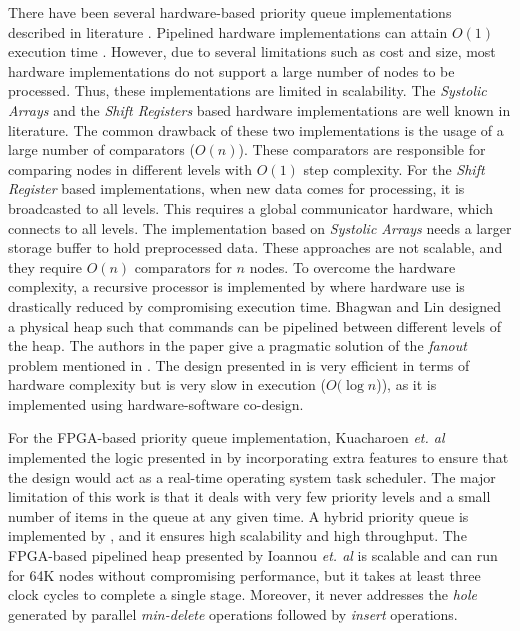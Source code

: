\documentclass[10pt, conference, compsocconf]{IEEEtran}
\begin{document}
There have been several hardware-based priority queue implementations described in literature \cite{hw1,hw2,hw3,hw5,hw6,hw7,hw8,hw9}.
Pipelined hardware implementations can attain $O(1)$ execution time \cite{hw5,hw6}.
However, due to several limitations such as cost and size, most hardware implementations do not support a large number of nodes to be processed.
Thus, these implementations are limited in scalability.
The {\it Systolic Arrays} and the {\it Shift Registers} \cite{hw8,hw9} based hardware implementations are well known in literature.
The common drawback of these two implementations is the usage of a large number of comparators ($O(n)$).
These comparators are responsible for comparing nodes in different levels with $O(1)$ step complexity.
For the {\it Shift Register} \cite{hw9} based implementations, when new data comes for processing, it is broadcasted to all levels.
This requires a global communicator hardware, which connects to all levels.
The implementation based on {\it Systolic Arrays} \cite{hw8} needs a larger storage buffer to hold preprocessed data.
These approaches are not scalable, and they require $O(n)$ comparators for $n$ nodes.
To overcome the hardware complexity, a recursive processor is implemented by \cite{hw10} where hardware use is drastically reduced by compromising execution time.
Bhagwan and Lin \cite{hw2} designed a physical heap such that commands can be pipelined between different levels of the heap.
The authors in the paper \cite{hw1} give a pragmatic solution of the {\it fanout} problem mentioned in \cite{hw3}.
The design presented in \cite{hw11} is very efficient in terms of hardware complexity but is very slow in execution ($O(\log n$)), as it is implemented using hardware-software co-design.

For the FPGA-based priority queue implementation, Kuacharoen {\it et. al} \cite{fpga3} implemented the logic presented in \cite{hw3} by incorporating extra features to ensure that the design would act as a real-time operating system task scheduler.
The major limitation of this work is that it deals with very few priority levels and a small number of items in the queue at any given time.
A hybrid priority queue is implemented by \cite{fpga2}, and it ensures high scalability and high throughput.
The FPGA-based pipelined heap presented by Ioannou {\it et. al} \cite{fpga1} is scalable and can run for 64K nodes without compromising performance, but it takes at least three clock cycles to complete a single stage.
Moreover, it never addresses the {\it hole} generated by parallel {\it min-delete} operations followed by {\it insert} operations.
\end{document}
